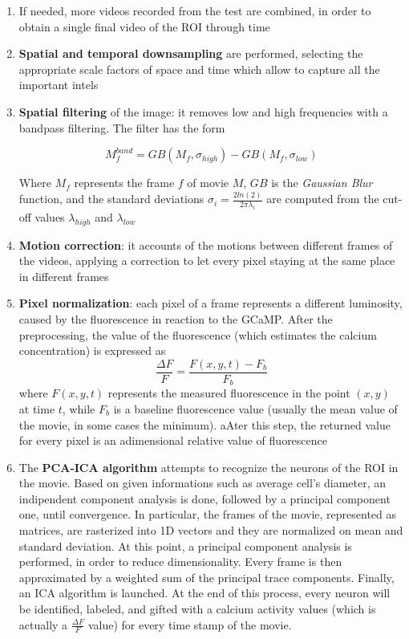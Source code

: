 \documentclass[a4paper]{article}
\begin{document}
\begin{enumerate}
	
	\item If needed, more videos recorded from the test are combined, in order to obtain a single final video of the ROI through time
	
	\item \textbf{Spatial and temporal downsampling} are performed, selecting the appropriate scale factors of space and time which allow to capture all the important intels
	
	\item \textbf{Spatial filtering} of the image: it removes low and high frequencies with a bandpass filtering. The filter has the form
	
	$$ M_f^{band} = GB(M_f,\sigma_{high}) - GB(M_f,\sigma_{low})$$
	
	Where $M_f$  represents the frame $f$ of movie $M$, $GB$ is the \textit{Gaussian Blur} function, and the standard deviations $ \sigma_i = \frac{2 ln(2)}{2 \pi \lambda_i}$ are computed from the cut-off values $ \lambda_{high}$ and $ \lambda_{low}$
	
	\item \textbf{Motion correction}: it accounts of the motions between different frames of the videos, applying a correction to let every pixel staying at the same place in different frames
	
	\item \textbf{Pixel normalization}: each pixel of a frame represents a different luminosity, caused by the fluorescence in reaction to the GCaMP. After the preprocessing, the value of the fluorescence (which estimates the calcium concentration) is expressed as 
	$$\frac{\Delta F }{F} = \frac{F(x,y,t) - F_b}{F_b}$$
	where $F(x,y,t)$ represents the measured fluorescence in the point $(x,y)$ at time $t$, while $F_b$ is a baseline fluorescence value (usually the mean value of the movie, in some cases the minimum). aAter this step, the returned value for every pixel is an adimensional relative value of fluorescence
	
	\item The \textbf{PCA-ICA algorithm} attempts to recognize the neurons of the ROI in the movie. Based on given informations such as average cell's diameter, an indipendent component analysis is done, followed by a principal component one, until convergence. In particular, the frames of the movie, represented as matrices, are rasterized into 1D vectors and they are normalized on mean and standard deviation. At this point, a principal component analysis is performed, in order to reduce dimensionality. Every frame is then approximated by a weighted sum of the principal trace components. Finally, an ICA algorithm is launched. At the end of this process, every neuron will be identified, labeled, and gifted with a calcium activity values (which is actually a $\frac{\Delta F }{F}$ value) for every time stamp of the movie. 
	

\end{enumerate}
\end{document}
